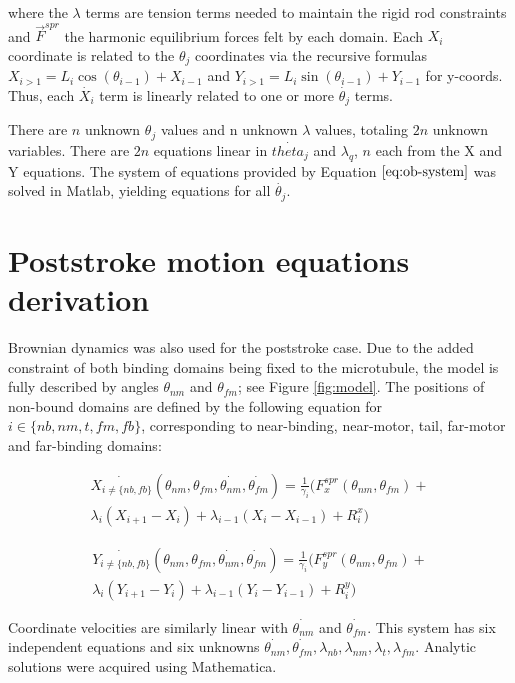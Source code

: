 \documentclass[9pt,twocolumn,twoside]{article}
\begin{document}
  where the $\lambda$ terms are tension terms needed to maintain the rigid rod constraints and $\vec{F}^{spr}$ the harmonic equilibrium forces felt by each domain. Each $X_i$ coordinate is related to the $\theta_j$ coordinates via the recursive formulas $X_{i>1} = L_i\cos(\theta_{i-1})+X_{i-1}$ and $Y_{i>1} = L_i\sin(\theta_{i-1})+Y_{i-1}$ for y-coords. Thus, each $\dot{X_i}$ term is linearly related to one or more $\dot{\theta_j}$ terms.

  There are $n$ unknown $\theta_j$ values and n unknown $\lambda$ values, totaling $2n$ unknown variables. There are $2n$ equations linear in $\dot{theta_j}$ and $\lambda_q$, $n$ each from the X and Y equations. The system of equations provided by Equation $\ref{eq:ob-system}$ was solved in Matlab, yielding equations for all $\dot{\theta_j}$.

  \section*{Poststroke motion equations derivation}
  Brownian dynamics was also used for the poststroke case. Due to the added constraint of both binding domains being fixed to the microtubule, the model is fully described by angles $\theta_{nm}$ and $\theta_{fm}$; see Figure \ref{fig:model}. The positions of non-bound domains are defined by the following equation for $i \in \{nb, nm, t, fm, fb\}$, corresponding to near-binding, near-motor, tail, far-motor and far-binding domains:

  \begin{multline}
    \dot{X_{i\neq\{nb, fb\}}}\left(\theta_{nm},\theta_{fm}, \dot{\theta_{nm}}, \dot{\theta_{fm}}\right) = \frac{1}{\gamma_i}\big(F^{spr}_x(\theta_{nm}, \theta_{fm}) + \\
    \lambda_i\left(X_{i+1}-X_i\right) + \lambda_{i-1}\left(X_i-X_{i-1}\right) + R^x_i\big)
    \label{eq:bb-system}
  \end{multline}

  \begin{multline}
    \dot{Y_{i\neq\{nb, fb\}}}\left(\theta_{nm},\theta_{fm}, \dot{\theta_{nm}}, \dot{\theta_{fm}}\right) = \frac{1}{\gamma_i}\big(F^{spr}_y(\theta_{nm}, \theta_{fm}) + \\
    \lambda_i\left(Y_{i+1}-Y_i\right) + \lambda_{i-1}\left(Y_i-Y_{i-1}\right) + R^y_i\big)
    \label{eq:bb-system}
  \end{multline}

  Coordinate velocities are similarly linear with $\dot{\theta_{nm}}$ and $\dot{\theta_{fm}}$. This system has six independent equations and six unknowns $\dot{\theta_{nm}}, \dot{\theta_{fm}}, \lambda_{nb}, \lambda_{nm}, \lambda_{t}, \lambda_{fm}$. Analytic solutions were acquired using Mathematica.
\end{document}
